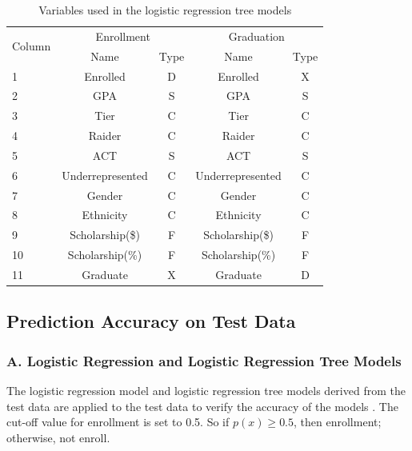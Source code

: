 \documentclass[12pt,english]{report}
\begin{document}
\begin{table}[H]
\centering
\begin{tabular}{|l|c|c|c|c|}
\hline
\multicolumn{1}{|c|}{\multirow{2}{*}{Column}} & \multicolumn{2}{c|}{Enrollment}
& \multicolumn{2}{c|}{Graduation}                            \\ \cline{2-5}
\multicolumn{1}{|c|}{}                        & Name                          &
Type                     & Name                          & Type
\\ \hline
1                                             & Enrolled                      &
D                        & Enrolled                      & X
\\ \hline
2                                             & GPA                           &
S                        & GPA                           & S
\\ \hline
3      & Tier   & C    &   Tier   & C    \\ \hline
4    & Raider     & C   &   Raider  & C   \\ \hline
5   & ACT    & S  &  ACT    & S     \\ \hline
6   & Underrepresented & C     & Underrepresented    & C   \\ \hline
7    & Gender   & C   &  Gender  & C   \\ \hline
8   & Ethnicity    & C     & Ethnicity   & C      \\ \hline
9   & Scholarship(\$)    & F   & Scholarship(\$)     & F    \\ \hline
10  & Scholarship(\%)   & F     & Scholarship(\%)     & F  \\ \hline
11  & Graduate   & X     &   Graduate        & D         \\ \hline
\end{tabular}
\caption{Variables used in the logistic regression tree models}
\end{table}

\subsection{Prediction Accuracy on Test Data }
\subsubsection{A. Logistic Regression and Logistic Regression Tree Models }
The logistic regression model and logistic regression tree models derived from the test data are applied to the test data to verify the accuracy of the models .  The cut-off value for enrollment is set to 0.5. So if  $p(x) \geq 0.5$, then enrollment;  otherwise, not enroll.   
\end{document}
